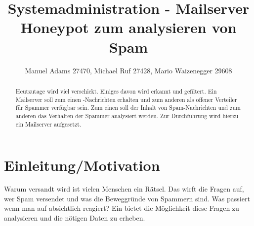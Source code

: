 \documentclass[a4paper,11pt,singlespacing]{article}
\begin{document}

\title{Systemadministration - Mailserver Honeypot zum analysieren von Spam}
\author{Manuel Adams 27470, Michael Ruf 27428, Mario Waizenegger 29608}
\maketitle
\begin{abstract}
Heutzutage wird viel  verschickt. Einiges davon wird erkannt und gefiltert.
Ein Mailserver soll zum einen -Nachrichten erhalten und zum anderen als offener Verteiler für Spammer verfügbar sein.
Zum einen soll der Inhalt von Spam-Nachrichten und zum anderen das Verhalten der Spammer analysiert werden.
Zur Durchführung wird hierzu ein Mailserver  aufgesetzt.
\end{abstract}

\newpage

\tableofcontents

\newpage
{}

\section{Einleitung/Motivation}\label{sec:Einleitung}
	Warum  versandt wird ist vielen Menschen ein Rätsel.
	Das wirft die Fragen auf, wer Spam versendet und was die Beweggründe von Spammern sind.
	Was passiert wenn man auf  absichtlich reagiert?
	Ein   bietet die Möglichkeit diese Fragen zu analysieren und die nötigen Daten zu erheben.
\end{document}
